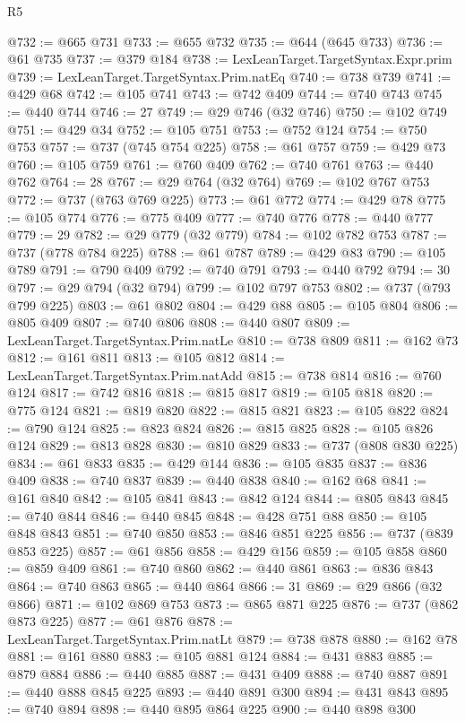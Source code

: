 \begin{lexlean}{R5}
\begin{coremodule}
@732 := @665 @731
@733 := @655 @732
@735 := @644 (@645 @733)
@736 := @61 @735
@737 := @379 @184
@738 := LexLeanTarget.TargetSyntax.Expr.prim
@739 := LexLeanTarget.TargetSyntax.Prim.natEq
@740 := @738 @739
@741 := @429 @68
@742 := @105 @741
@743 := @742 @409
@744 := @740 @743
@745 := @440 @744
@746 := 27
@749 := @29 @746 (@32 @746)
@750 := @102 @749
@751 := @429 @34
@752 := @105 @751
@753 := @752 @124
@754 := @750 @753
@757 := @737 (@745 @754 @225)
@758 := @61 @757
@759 := @429 @73
@760 := @105 @759
@761 := @760 @409
@762 := @740 @761
@763 := @440 @762
@764 := 28
@767 := @29 @764 (@32 @764)
@769 := @102 @767 @753
@772 := @737 (@763 @769 @225)
@773 := @61 @772
@774 := @429 @78
@775 := @105 @774
@776 := @775 @409
@777 := @740 @776
@778 := @440 @777
@779 := 29
@782 := @29 @779 (@32 @779)
@784 := @102 @782 @753
@787 := @737 (@778 @784 @225)
@788 := @61 @787
@789 := @429 @83
@790 := @105 @789
@791 := @790 @409
@792 := @740 @791
@793 := @440 @792
@794 := 30
@797 := @29 @794 (@32 @794)
@799 := @102 @797 @753
@802 := @737 (@793 @799 @225)
@803 := @61 @802
@804 := @429 @88
@805 := @105 @804
@806 := @805 @409
@807 := @740 @806
@808 := @440 @807
@809 := LexLeanTarget.TargetSyntax.Prim.natLe
@810 := @738 @809
@811 := @162 @73
@812 := @161 @811
@813 := @105 @812
@814 := LexLeanTarget.TargetSyntax.Prim.natAdd
@815 := @738 @814
@816 := @760 @124
@817 := @742 @816
@818 := @815 @817
@819 := @105 @818
@820 := @775 @124
@821 := @819 @820
@822 := @815 @821
@823 := @105 @822
@824 := @790 @124
@825 := @823 @824
@826 := @815 @825
@828 := @105 @826 @124
@829 := @813 @828
@830 := @810 @829
@833 := @737 (@808 @830 @225)
@834 := @61 @833
@835 := @429 @144
@836 := @105 @835
@837 := @836 @409
@838 := @740 @837
@839 := @440 @838
@840 := @162 @68
@841 := @161 @840
@842 := @105 @841
@843 := @842 @124
@844 := @805 @843
@845 := @740 @844
@846 := @440 @845
@848 := @428 @751 @88
@850 := @105 @848 @843
@851 := @740 @850
@853 := @846 @851 @225
@856 := @737 (@839 @853 @225)
@857 := @61 @856
@858 := @429 @156
@859 := @105 @858
@860 := @859 @409
@861 := @740 @860
@862 := @440 @861
@863 := @836 @843
@864 := @740 @863
@865 := @440 @864
@866 := 31
@869 := @29 @866 (@32 @866)
@871 := @102 @869 @753
@873 := @865 @871 @225
@876 := @737 (@862 @873 @225)
@877 := @61 @876
@878 := LexLeanTarget.TargetSyntax.Prim.natLt
@879 := @738 @878
@880 := @162 @78
@881 := @161 @880
@883 := @105 @881 @124
@884 := @431 @883
@885 := @879 @884
@886 := @440 @885
@887 := @431 @409
@888 := @740 @887
@891 := @440 @888 @845 @225
@893 := @440 @891 @300
@894 := @431 @843
@895 := @740 @894
@898 := @440 @895 @864 @225
@900 := @440 @898 @300

\end{coremodule}
\end{lexlean}
